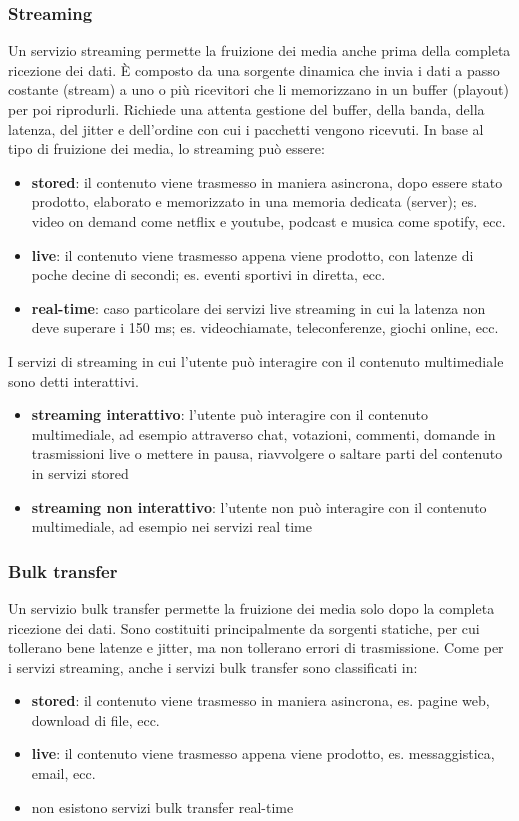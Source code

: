 \subsubsection*{Streaming}
Un servizio streaming permette la fruizione dei media anche prima della completa ricezione dei dati. È composto da una
sorgente dinamica che invia i dati a passo costante (stream) a uno o più ricevitori che li memorizzano in un buffer
(playout) per poi riprodurli. Richiede una attenta gestione del buffer, della banda, della latenza, del jitter e
dell'ordine con cui i pacchetti vengono ricevuti. In base al tipo di fruizione dei media, lo streaming può essere:
\begin{itemize}
	\item \textbf{stored}: il contenuto viene trasmesso in maniera asincrona, dopo essere stato prodotto, elaborato
	e memorizzato in una memoria dedicata (server); es. video on demand come netflix e youtube, podcast e musica
	come spotify, ecc.
	\item \textbf{live}: il contenuto viene trasmesso appena viene prodotto, con latenze di poche decine di secondi;
	es. eventi sportivi in diretta, ecc.
	\item \textbf{real-time}: caso particolare dei servizi live streaming in cui la latenza non deve superare i 150 ms;
	es. videochiamate, teleconferenze, giochi online, ecc.
\end{itemize}

\noindent
I servizi di streaming in cui l'utente può interagire con il contenuto multimediale sono detti interattivi.
\begin{itemize}
	\item \textbf{streaming interattivo}: l'utente può interagire con il contenuto multimediale, ad esempio attraverso
	chat, votazioni, commenti, domande in trasmissioni live o mettere in pausa, riavvolgere o saltare parti del contenuto
	in servizi stored
	\item \textbf{streaming non interattivo}: l'utente non può interagire con il contenuto multimediale, ad esempio nei
	servizi real time
\end{itemize}
	
\subsubsection*{Bulk transfer}
Un servizio bulk transfer permette la fruizione dei media solo dopo la completa ricezione dei dati. Sono costituiti
principalmente da sorgenti statiche, per cui tollerano bene latenze e jitter, ma non tollerano errori di trasmissione.
Come per i servizi streaming, anche i servizi bulk transfer sono classificati in:
\begin{itemize}
	\item \textbf{stored}: il contenuto viene trasmesso in maniera asincrona, es. pagine web, download di file, ecc.
	\item \textbf{live}: il contenuto viene trasmesso appena viene prodotto, es. messaggistica, email, ecc.
	\item non esistono servizi bulk transfer real-time
\end{itemize}

